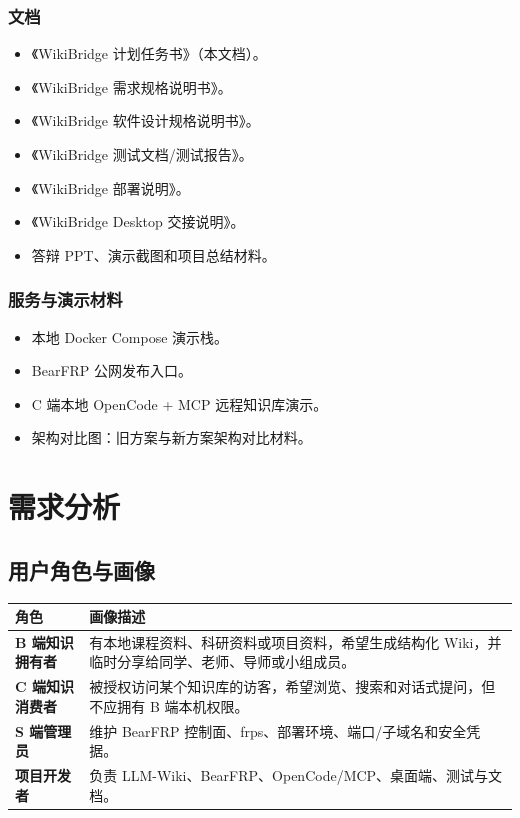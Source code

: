 \documentclass[UTF8,a4paper,12pt,fontset=fandol]{ctexart}
\begin{document}
\subsubsection{文档}
\begin{itemize}
  \item 《WikiBridge 计划任务书》（本文档）。
  \item 《WikiBridge 需求规格说明书》。
  \item 《WikiBridge 软件设计规格说明书》。
  \item 《WikiBridge 测试文档/测试报告》。
  \item 《WikiBridge 部署说明》。
  \item 《WikiBridge Desktop 交接说明》。
  \item 答辩 PPT、演示截图和项目总结材料。
\end{itemize}

\subsubsection{服务与演示材料}
\begin{itemize}
  \item 本地 Docker Compose 演示栈。
  \item BearFRP 公网发布入口。
  \item C 端本地 OpenCode + MCP 远程知识库演示。
  \item 架构对比图：旧方案与新方案架构对比材料。
\end{itemize}

\section{需求分析}

\subsection{用户角色与画像}
\begin{longtable}{>{\bfseries}p{3.6cm}p{10.6cm}}
\toprule
角色 & 画像描述 \\
\midrule
B 端知识拥有者 & 有本地课程资料、科研资料或项目资料，希望生成结构化 Wiki，并临时分享给同学、老师、导师或小组成员。 \\
C 端知识消费者 & 被授权访问某个知识库的访客，希望浏览、搜索和对话式提问，但不应拥有 B 端本机权限。 \\
S 端管理员 & 维护 BearFRP 控制面、frps、部署环境、端口/子域名和安全凭据。 \\
项目开发者 & 负责 LLM-Wiki、BearFRP、OpenCode/MCP、桌面端、测试与文档。 \\
\bottomrule
\end{longtable}
\end{document}

